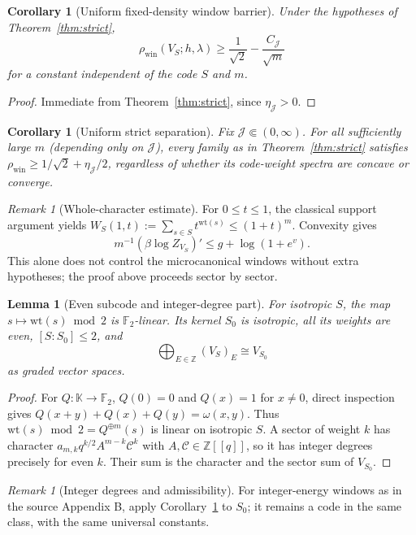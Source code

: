 \documentclass[10pt,a4paper]{article}
\numberwithin{equation}{section}
\newtheorem{lemma}[theorem]{Lemma}\newtheorem{proposition}[theorem]{Proposition}
\newtheorem{corollary}[theorem]{Corollary}
\theoremstyle{remark}\newtheorem{remark}[theorem]{Remark}\newtheorem{question}[theorem]{Question}
\newcommand{\rhow}{\rho_{\mathrm{win}}}\newcommand{\F}{\mathbb F}\newcommand{\K}{\mathbb K}\newcommand{\Z}{\mathbb Z}\newcommand{\R}{\mathbb R}\newcommand{\cB}{\mathcal L}\newcommand{\wt}{\mathrm{wt}}\newcommand{\dimn}{\operatorname{dim}}\newcommand{\supp}{\operatorname{supp}}
\begin{document}
\begin{corollary}[Uniform fixed-density window barrier]\label{thm:main}
Under the hypotheses of Theorem~\ref{thm:strict},
\[
\rhow(V_S;h,\lambda)\ge\frac1{\sqrt2}-\frac{C_{\mathcal J}}{\sqrt m}
\]
for a constant independent of the code $S$ and $m$.
\end{corollary}
\begin{proof}
Immediate from Theorem~\ref{thm:strict}, since $\eta_{\mathcal J}>0$.
\end{proof}

\begin{corollary}[Uniform strict separation]\label{cor:fixed}
Fix $\mathcal J\Subset(0,\infty)$. For all sufficiently large $m$
(depending only on $\mathcal J$), every family as in
Theorem~\ref{thm:strict} satisfies
$\rhow\ge 1/\sqrt2+\eta_{\mathcal J}/2$,
regardless of whether its code-weight spectra are concave or converge.
\end{corollary}
\begin{remark}[Whole-character estimate]\label{rem:whole}
For $0\le t\le1$, the classical support argument yields $W_S(1,t):=\sum_{s\in S}t^{\wt(s)}\le(1+t)^m$. Convexity gives
\[m^{-1}(\beta\log Z_{V_S})'\le g+\log(1+e^v).\]
This alone does not control the microcanonical windows without extra hypotheses; the proof above proceeds sector by sector.\end{remark}

\begin{lemma}[Even subcode and integer-degree part]\label{lem:even}
For isotropic $S$, the map $s\mapsto\wt(s)\bmod2$ is $\F_2$-linear. Its kernel $S_0$ is isotropic, all its weights are even, $[S:S_0]\le2$, and
\[
\bigoplus_{E\in\Z}(V_S)_E\cong V_{S_0}
\]
as graded vector spaces.
\end{lemma}
\begin{proof}For $Q:\K\to\F_2$, $Q(0)=0$ and $Q(x)=1$ for $x\ne0$, direct inspection gives $Q(x+y)+Q(x)+Q(y)=\omega(x,y)$. Thus $\wt(s)\bmod2=Q^{\oplus m}(s)$ is linear on isotropic $S$. A sector of weight $k$ has character $a_{m,k}q^{k/2}A^{m-k}\mathcal C^k$ with $A,\mathcal C\in\Z[[q]]$, so it has integer degrees precisely for even $k$. Their sum is the character and the sector sum of $V_{S_0}$.\end{proof}
\begin{remark}[Integer degrees and admissibility]
For integer-energy windows as in the source Appendix B, apply Corollary~\ref{thm:main} to $S_0$; it remains a code in the same class, with the same universal constants.\end{remark}
\end{document}
